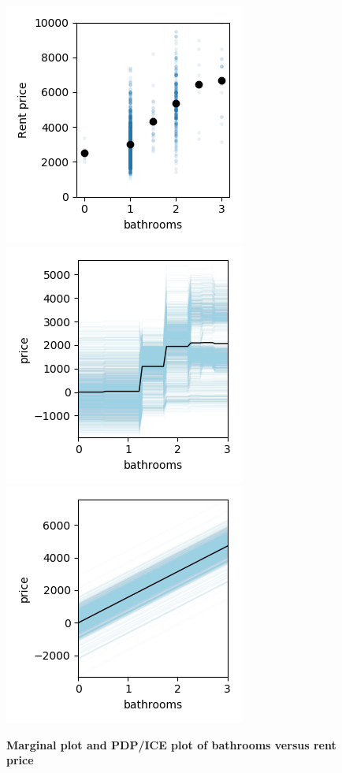 \documentclass[12pt]{article}
\begin{document}
\begin{figure}[htbp]
\begin{center}
\includegraphics[scale=0.7]{images/baths_vs_price.png}
\includegraphics[scale=0.7]{images/baths_vs_price_pdp.png}
\includegraphics[scale=0.7]{images/baths_vs_price_pdp_lm.png}
\caption{{\bf  Marginal plot and PDP/ICE plot of bathrooms versus rent price}}
\label{fig:baths_price}
\end{center}
\end{figure}
\end{document}
